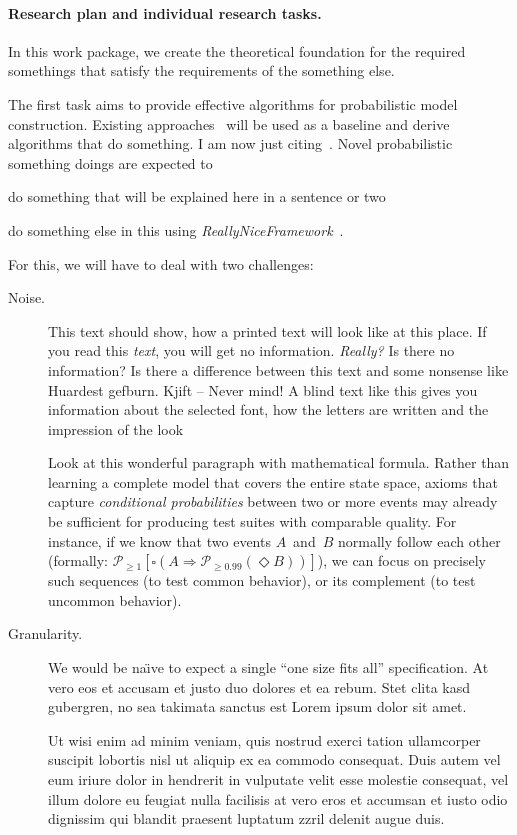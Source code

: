 \paragraph{Research plan and individual research tasks.}
In this work package, we create the theoretical foundation for the required somethings that satisfy the requirements of the something else.

\label{task-wp1-1}

The first task aims to provide effective algorithms for probabilistic model construction.  Existing approaches~\cite{Hoorn2012} will be used as a baseline and derive algorithms that do something. I am now just citing~\cite{AspectJ}.  Novel probabilistic something doings are expected to
\begin{compact_itemize}
    \item do something that will be explained here in a sentence or two
    \item do something else in this using {\it ReallyNiceFramework}~\cite{Frey2011}.
\end{compact_itemize}
%
For this, we will have to deal with two challenges:
\begin{description}
    \item[Noise.] This text should show, how a printed text will look like at this place. If you read this \emph{text}, you will get no information. \emph{Really?} Is there no information? Is there a difference between this text and some nonsense like Huardest gefburn. Kjift – Never mind! A blind text like this gives you information about the selected font, how the letters are written and the impression of the look

Look at this wonderful paragraph with mathematical formula.  Rather than learning a complete model that covers the entire state space, axioms that capture \emph{conditional probabilities} between two or more events may already be sufficient for producing test suites with comparable quality.  For instance, if we know that two events $A$~and~$B$ normally follow each other (formally: $\mathcal{P}_{\geq 1} [\square(A \Rightarrow \mathcal{P}_{\geq 0.99}(\Diamond B) )]$), we can focus on precisely such sequences (to test common behavior), or its complement (to test uncommon behavior).

    \item[Granularity.]  We would be na\"\i{}ve to expect a single ``one size fits all'' specification. At vero eos et accusam et justo duo dolores et ea rebum. Stet clita kasd gubergren, no sea takimata sanctus est Lorem ipsum dolor sit amet.

Ut wisi enim ad minim veniam, quis nostrud exerci tation ullamcorper suscipit lobortis nisl ut aliquip ex ea commodo consequat. Duis autem vel eum iriure dolor in hendrerit in vulputate velit esse molestie consequat, vel illum dolore eu feugiat nulla facilisis at vero eros et accumsan et iusto odio dignissim qui blandit praesent luptatum zzril delenit augue duis.
\end{description}

